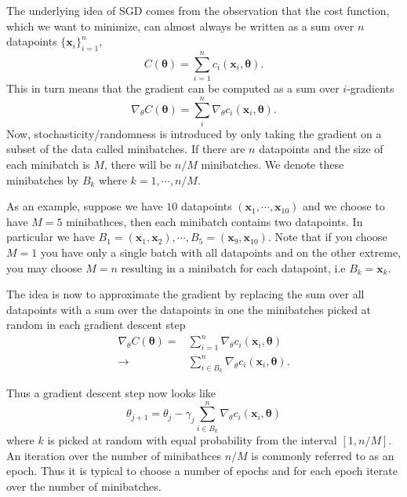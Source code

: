 \documentclass[a4paper, twocolumn]{article}
\begin{document}
The underlying idea of SGD comes from the observation that the cost function, which we want to minimize, can almost always be 
written as a sum over $n$ datapoints $\{\mathbf{x}_i\}_{i=1}^n$,
\begin{equation}
 C(\mathbf{\theta}) = \sum_{i=1}^n c_i(\mathbf{x}_i, \mathbf{\theta}). 
\end{equation}
This in turn means that the gradient can be computed as a sum over $i$-gradients 
\begin{equation}
\nabla_\theta C(\mathbf{\theta}) = \sum_i^n \nabla_\theta c_i(\mathbf{x}_i, \mathbf{\theta}).  
\end{equation}
Now, stochasticity/randomness is introduced by only taking the gradient on a subset of the data called minibatches.  
If there are $n$ datapoints and the size of each minibatch is $M$, there will be $n/M$ minibatches. We denote these 
minibatches by $B_k$ where $k=1,\cdots,n/M$. 

As an example, suppose we have $10$ datapoints $( \mathbf{x}_1, \cdots, \mathbf{x}_{10} )$ and we choose to have $M=5$
minibathces, then each minibatch contains two datapoints. In particular we have 
$B_1 = (\mathbf{x}_1,\mathbf{x}_2), \cdots, B_5 = (\mathbf{x}_9,\mathbf{x}_{10})$. Note that if you choose $M=1$ you have 
only a single batch with all datapoints and on the other extreme, you may choose $M=n$ resulting in a minibatch for each 
datapoint, i.e $B_k = \mathbf{x}_k$.

The idea is now to approximate the gradient by replacing the sum over all datapoints with a sum over the datapoints in one the 
minibatches picked at random in each gradient descent step
\begin{align}\nabla_\theta C(\mathbf{\theta}) = &\sum_{i=1}^n \nabla_\theta c_i(\mathbf{x}_i, \mathbf{\theta}) \nonumber \\
\rightarrow &\sum_{i \in B_k}^n \nabla_\theta c_i(\mathbf{x}_i, \mathbf{\theta}).
\end{align}
                                                                                                                                                                                                 
Thus a gradient descent step now looks like 
\begin{equation} \theta_{j+1} = \theta_j - \gamma_j \sum_{i \in B_k}^n \nabla_\theta c_i(\mathbf{x}_i, \mathbf{\theta}) \end{equation}
where $k$ is picked at random with equal probability from the interval $[1,n/M]$. An iteration over the number of 
minibathces $n/M$ is commonly referred to as an epoch. Thus it is typical to choose a number of epochs and for each epoch 
iterate over the number of minibatches.
 
\end{document}
